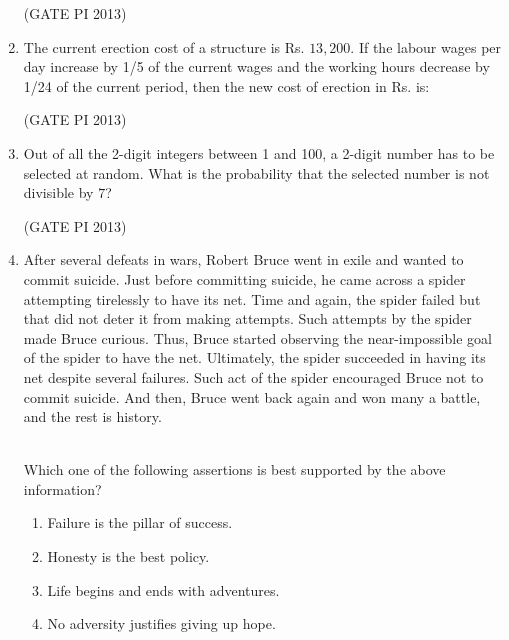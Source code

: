 \documentclass[journal,12pt,onecolumn]{IEEEtran}
\theoremstyle{remark}
\begin{document}
\begin{enumerate}
\hfill (GATE PI 2013)


\item The current erection cost of a structure is Rs. $13{,}200$.  
If the labour wages per day increase by 1/5 of the current wages and the working hours decrease by 1/24 of the current period, then the new cost of erection in Rs. is:
\begin{enumerate}
\end{enumerate}


\hfill (GATE PI 2013)

\item Out of all the 2-digit integers between 1 and 100, a 2-digit number has to be selected at random.  
What is the probability that the selected number is not divisible by $7$?
\begin{enumerate}
\end{enumerate}

\hfill (GATE PI 2013)

\item After several defeats in wars, Robert Bruce went in exile and wanted to commit suicide. Just before committing suicide, he came across a spider attempting tirelessly to have its net. Time and again, the spider failed but that did not deter it from making attempts. Such attempts by the spider made Bruce curious. Thus, Bruce started observing the near-impossible goal of the spider to have the net. Ultimately, the spider succeeded in having its net despite several failures. Such act of the spider encouraged Bruce not to commit suicide. And then, Bruce went back again and won many a battle, and the rest is history.  \\\  

Which one of the following assertions is best supported by the above information? \\
\begin{enumerate}
\item Failure is the pillar of success.
\item Honesty is the best policy.
\item Life begins and ends with adventures.
\item No adversity justifies giving up hope. \\
\end{enumerate}


\end{enumerate}
\end{document}
